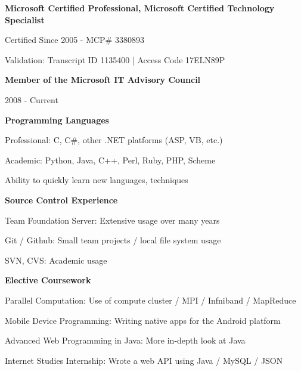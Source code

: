\documentclass[10pt]{article}
\begin{document}
\begin{innerlist}
  \item[] \textbf{Microsoft Certified Professional, Microsoft Certified Technology Specialist}
  \begin{innerlist}
    \item Certified Since 2005 - MCP\# 3380893
    \item Validation: Transcript ID 1135400 | Access Code 17ELN89P
  \end{innerlist}

  \item[] \textbf{Member of the Microsoft IT Advisory Council}
  \begin{innerlist}
    \item 2008 - Current
  \end{innerlist}

  \item[] \textbf{Programming Languages}
  \begin{innerlist}
    \item Professional: C, C\#, other .NET platforms (ASP, VB, etc.)
    \item Academic: Python, Java, C++, Perl, Ruby, PHP, Scheme
    \item Ability to quickly learn new languages, techniques
  \end{innerlist}

  \item[] \textbf{Source Control Experience}
  \begin{innerlist}
    \item Team Foundation Server: Extensive usage over many years
    \item Git / Github: Small team projects / local file system usage
    \item SVN, CVS: Academic usage
  \end{innerlist}
  
  \item[] \textbf{Elective Coursework}
  \begin{innerlist}
    \item Parallel Computation: Use of compute cluster / MPI / Infniband / MapReduce
    \item Mobile Device Programming: Writing native apps for the Android platform
    \item Advanced Web Programming in Java: More in-depth look at Java
    \item Internet Studies Internship: Wrote a web API using Java / MySQL / JSON
  \end{innerlist}


\end{innerlist}
\end{document}
